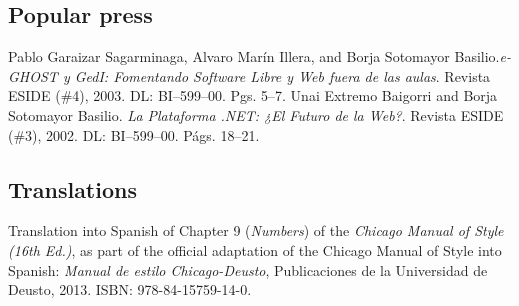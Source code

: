 \documentclass{resume}
\begin{document}
\subsection*{Popular press}
\begin{category}{}
\citembullet Pablo Garaizar Sagarminaga, Alvaro Marín Illera, and Borja Sotomayor Basilio.\emph{e-GHOST y GedI: Fomentando Software Libre y Web fuera de las aulas}. Revista ESIDE (\#4), 2003. DL: BI--599--00. Pgs. 5--7. 
\citembullet Unai Extremo Baigorri and Borja Sotomayor Basilio.
\emph{La Plataforma .NET: ¿El Futuro de la Web?}. Revista ESIDE
(\#3), 2002. DL: BI--599--00. Págs. 18--21.
\end{category}

\subsection*{Translations}
\begin{category}{}
\citembullet Translation into Spanish of Chapter 9 (\emph{Numbers}) of the \emph{Chicago Manual of Style (16th Ed.)}, as part of the official adaptation of the Chicago Manual of Style into Spanish: \emph{Manual de estilo Chicago-Deusto}, Publicaciones de la Universidad de Deusto, 2013. ISBN: 978-84-15759-14-0.
\end{category}
\end{document}
